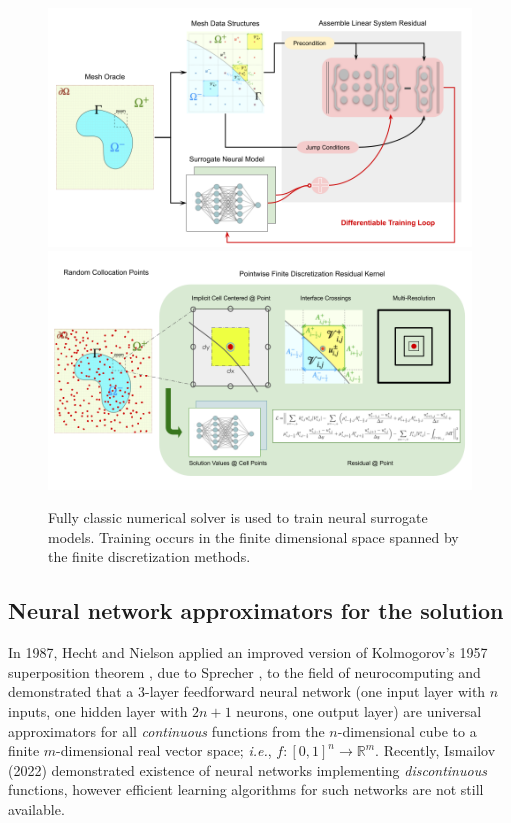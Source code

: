 \documentclass{elsarticle}
\begin{document}
\begin{figure}[ht]
	\centering
	\includegraphics[width=0.85\linewidth]{./figures/jax_dips_paper_v1.png}
	\includegraphics[width=0.85\linewidth]{./figures/jax_dips_paper_kernel.png}
	\caption{Fully classic numerical solver is used to train neural surrogate models. Training occurs in the finite dimensional space spanned by the finite discretization methods.}
	\label{fig:proposal}
\end{figure}



\subsection{Neural network approximators for the solution}

In 1987, Hecht and Nielson \cite{hecht1987kolmogorov} applied an improved version of Kolmogorov's 1957 superposition theorem \cite{kolmogorov1957representation}, due to Sprecher \cite{sprecher1965structure}, to the field of neurocomputing and demonstrated that a $3$-layer feedforward neural network (one input layer with $n$ inputs, one hidden layer with $2n+1$ neurons, one output layer) are universal approximators for all \textit{continuous} functions from the $n$-dimensional cube to a finite $m$-dimensional real vector space; \textit{i.e.}, $f: [0,1]^n \rightarrow \mathbb{R}^m $. Recently, Ismailov (2022) \cite{ismailov2022} demonstrated existence of neural networks implementing \textit{discontinuous} functions, however efficient learning algorithms for such networks are not still available. 
\end{document}

